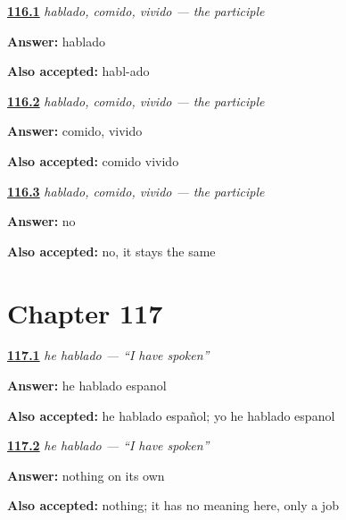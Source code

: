 \noindent\begin{minipage}[t]{\linewidth}
\raggedright
\hyperlink{review-ES-C49-participio-ar}{\textbf{116.1}} \emph{hablado, comido, vivido — the participle}\par
\small \textbf{Answer:} hablado\par
\footnotesize \textbf{Also accepted:} habl-ado
\end{minipage}\par\medskip

\noindent\begin{minipage}[t]{\linewidth}
\raggedright
\hyperlink{review-ES-C49-participio-erir}{\textbf{116.2}} \emph{hablado, comido, vivido — the participle}\par
\small \textbf{Answer:} comido, vivido\par
\footnotesize \textbf{Also accepted:} comido vivido
\end{minipage}\par\medskip

\noindent\begin{minipage}[t]{\linewidth}
\raggedright
\hyperlink{review-ES-C49-participio-person}{\textbf{116.3}} \emph{hablado, comido, vivido — the participle}\par
\small \textbf{Answer:} no\par
\footnotesize \textbf{Also accepted:} no, it stays the same
\end{minipage}\par\medskip

\section*{Chapter 117}

\noindent\begin{minipage}[t]{\linewidth}
\raggedright
\hyperlink{review-ES-C49-he-hablado-say}{\textbf{117.1}} \emph{he hablado — \textquotedblleft{}I have spoken\textquotedblright{}}\par
\small \textbf{Answer:} he hablado espanol\par
\footnotesize \textbf{Also accepted:} he hablado español; yo he hablado espanol
\end{minipage}\par\medskip

\noindent\begin{minipage}[t]{\linewidth}
\raggedright
\hyperlink{review-ES-C49-he-hablado-mean}{\textbf{117.2}} \emph{he hablado — \textquotedblleft{}I have spoken\textquotedblright{}}\par
\small \textbf{Answer:} nothing on its own\par
\footnotesize \textbf{Also accepted:} nothing; it has no meaning here, only a job
\end{minipage}\par\medskip


